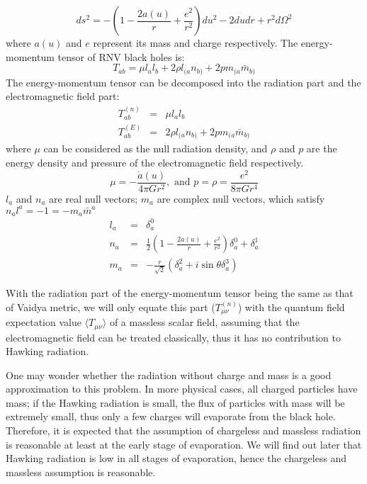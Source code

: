 \documentclass[letterpaper,12pt]{article}
\begin{document}
\begin{equation}\label{eq:1-3}
ds^{2} = -\left(1-\frac{2a(u)}{r}+ \frac{e^2}{r^2}\right)du^2 - 2dudr + r^2d\Omega^2
\end{equation}
where $a(u)$ and $e$ represent its mass and charge respectively.
The energy-momentum tensor of RNV black holes is:
\begin{equation}
T_{ab}=  \mu l_{a}l_{b}+2\rho l_{(a}n_{b)}+2pm_{(a}\bar{m}_{b)}
\end{equation}
The energy-momentum tensor can be decomposed into the radiation part and the electromagnetic field part:
\begin{eqnarray}
  T^{(n)}_{ab} &=& \mu l_{a}l_{b} \\
  T^{(E)}_{ab} &=& 2\rho l_{(a}n_{b)}+2pm_{(a}\bar{m}_{b)}
\end{eqnarray}
where $\mu$ can be considered as the null radiation density, and $\rho$ and $p$ are the energy density and pressure of the electromagnetic field respectively.
\begin{equation}
\mu = -\frac{\dot{a}(u)}{4\pi Gr^{2}}, \textrm{ and } p = \rho = \frac{e^2}{8\pi G r^{4}}
\end{equation}
$l_{a}$ and $n_{a}$ are real null vectors; $m_{a}$ are complex null vectors, which satisfy $n_{a}l^{a} = -1 = -m_{a}\bar{m}^{a}$
\begin{eqnarray}\label{eq:1-2}
  l_{a} &=& \delta_{a}^{0} \\
  n_{a} &=&  \frac{1}{2}\left(1-\frac{2a(u)}{r}+ \frac{e^2}{r^2}\right) \delta_{a}^{0}+ \delta_{a}^{1} \\
  m_{a} &=& -\frac{r}{\sqrt{2}}\left( \delta_{a}^{2}+ i\sin\theta \delta_{a}^{3}\right)
\end{eqnarray}

With the radiation part of the energy-momentum tensor being the same as that of Vaidya metric, we will only equate this part ($T^{(n)}_{\mu\nu}$) with the quantum field expectation value $ \langle T_{\mu\nu} \rangle$ of a massless scalar field, assuming that the electromagnetic field can be treated classically, thus it has no contribution to Hawking radiation.

One may wonder whether the radiation without charge and mass is a good approximation to this problem. In more physical cases, all charged particles have mass; if the Hawking radiation is small, the flux of particles with mass will be extremely small, thus only a few charges will evaporate from the black hole.
Therefore, it is expected that the assumption of chargeless and massless radiation is reasonable at least at the early stage of evaporation. We will find out later that Hawking radiation is low in all stages of evaporation, hence the chargeless and massless assumption is reasonable.
\end{document}
